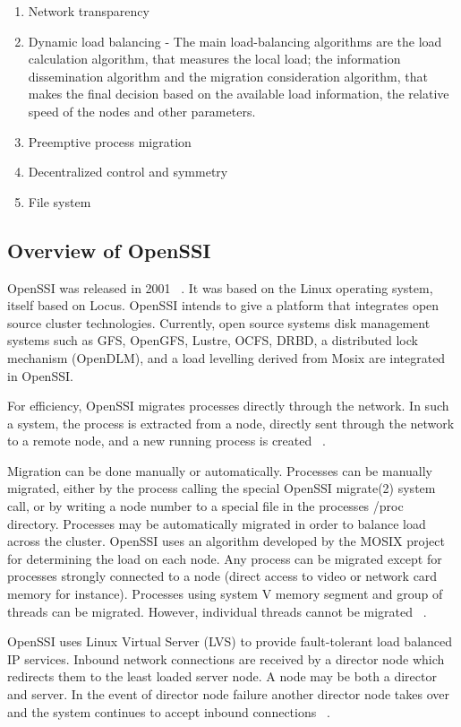 \documentclass[preprint]{acm_proc_article-sp}
\begin{document}
\begin{enumerate}
	\item Network transparency
	\item Dynamic load balancing - The main load-balancing algorithms are the load calculation algorithm, that measures the local load; the information dissemination algorithm and the migration consideration algorithm, that makes the final decision based on the available load information, the relative speed of the nodes and other parameters.
	\item Preemptive process migration
	\item Decentralized control and symmetry
	\item File system
\end{enumerate}

\subsection{Overview of OpenSSI}

OpenSSI was released in 2001 ~\citep{lottiaux04}. It was based on the Linux operating system, itself based on Locus. OpenSSI intends to give a platform that integrates open source cluster technologies. Currently, open source systems disk management systems such as GFS, OpenGFS, Lustre, OCFS, DRBD, a distributed lock mechanism (OpenDLM), and a load levelling derived from Mosix are integrated in OpenSSI.

For efficiency, OpenSSI migrates processes directly through the network. In such a system, the process is extracted from a node, directly sent through the network to a remote node, and a new running process is created ~\citep{vallee10}.

Migration can be done manually or automatically. Processes can be manually migrated, either by the process calling the special OpenSSI migrate(2) system call, or by writing a node number to a special file in the processes /proc directory. Processes may be automatically migrated in order to balance load across the cluster. OpenSSI uses an algorithm developed by the MOSIX project for determining the load on each node. Any process can be migrated except for processes strongly connected to a node (direct access to video or network card memory for instance). Processes using system V memory segment and group of threads can be migrated. However, individual threads cannot be migrated ~\citep{vallee10}.

OpenSSI uses Linux Virtual Server (LVS) to provide fault-tolerant load balanced IP services. Inbound network connections are received by a director node which redirects them to the least loaded server node. A node may be both a director and server. In the event of director node failure another director node takes over and the system continues to accept inbound connections ~\citep{vallee10}.
\end{document}
